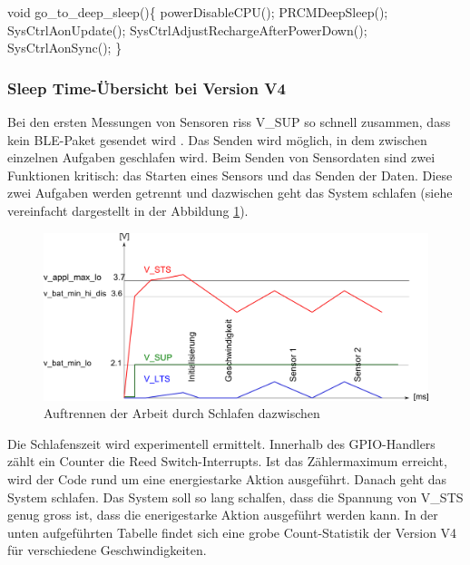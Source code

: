 
void go\_to\_deep\_sleep()\{ 
        \linebreak         
	    powerDisableCPU();\linebreak
	    PRCMDeepSleep();\linebreak
	    SysCtrlAonUpdate();\linebreak
	    SysCtrlAdjustRechargeAfterPowerDown();\linebreak
	    SysCtrlAonSync(); \linebreak
                \linebreak
\} \linebreak


\subsubsection{Sleep Time-Übersicht bei Version V4}
	    
Bei den ersten Messungen von Sensoren riss V\_SUP so schnell zusammen, dass kein BLE-Paket gesendet wird . Das Senden wird möglich, in dem zwischen einzelnen Aufgaben geschlafen wird. Beim Senden von Sensordaten sind zwei Funktionen kritisch: das Starten eines Sensors und das Senden der Daten. Diese zwei Aufgaben werden getrennt und dazwischen geht das System schlafen (siehe vereinfacht dargestellt in der Abbildung \ref{schnarch}).

\begin{figure}[ht]
  \includegraphics[width=1.0\textwidth]{3Vorgehen/imag/HIGH_ENERGY.png}
  \caption{Auftrennen der Arbeit durch Schlafen dazwischen}
  \label{schnarch}
\end{figure}


Die Schlafenszeit wird experimentell ermittelt. Innerhalb des GPIO-Handlers zählt ein Counter die Reed Switch-Interrupts. Ist  das Zählermaximum erreicht, wird der Code rund um eine energiestarke Aktion ausgeführt. Danach geht das System schlafen. Das System soll so lang schalfen, dass die Spannung von V\_STS genug gross ist, dass die enerigestarke Aktion ausgeführt werden kann. In der unten aufgeführten Tabelle findet sich eine grobe Count-Statistik der Version V4 für verschiedene Geschwindigkeiten. 

